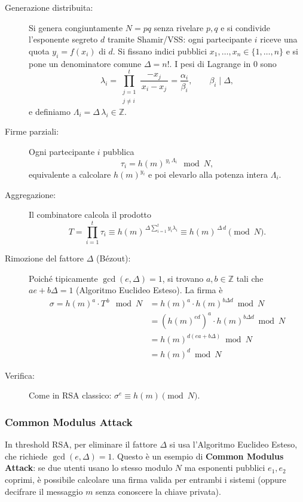 \documentclass[a4paper, 11pt]{article}
\begin{document}
\begin{description}
    \item[Generazione distribuita:] Si genera congiuntamente $N=pq$ senza rivelare $p,q$ e si condivide l’esponente segreto $d$ tramite Shamir/VSS: ogni partecipante $i$ riceve una quota $y_i=f(x_i)$ di $d$. Si fissano indici pubblici $x_1,\dots,x_n\in\{1,\dots,n\}$ e si pone un denominatore comune $\Delta=n!$. I pesi di Lagrange in $0$ sono
    \[
        \lambda_i=\prod_{\substack{j=1\\ j\neq i}}^{t}\frac{-x_j}{\,x_i-x_j\,}=\frac{\alpha_i}{\beta_i},\qquad \beta_i\mid \Delta,
    \]
    e definiamo $\Lambda_i=\Delta\,\lambda_i\in\mathbb{Z}$.
    \item[Firme parziali:] Ogni partecipante $i$ pubblica
    \[
        \tau_i = h(m)^{\,y_i\,\Lambda_i}\ \bmod N,
    \]
    equivalente a calcolare $h(m)^{y_i}$ e poi elevarlo alla potenza intera $\Lambda_i$.
    \item[Aggregazione:] Il combinatore calcola il prodotto
    \[
        T=\prod_{i=1}^{t}\tau_i \equiv h(m)^{\,\Delta\sum_{i=1}^{t}y_i\lambda_i}\equiv h(m)^{\,\Delta\,d}\pmod N.
    \]
    \item[Rimozione del fattore $\Delta$ (Bézout):] Poiché tipicamente $\gcd(e,\Delta)=1$, si trovano $a,b\in\mathbb{Z}$ tali che $ae+b\Delta=1$ (Algoritmo Euclideo Esteso). La firma è
    \begin{align*}        
        \sigma=h(m)^a\cdot T^{\,b}\ \bmod N 
        &= h(m)^a\cdot h(m)^{b \Delta d} \bmod N \\ 
        &= (h(m)^{ed})^a \cdot h(m)^{b\Delta d} \bmod N \\ 
        &= h(m)^{d(ea + b\Delta)} \bmod N \\ 
        &= h(m)^d \bmod N
    \end{align*}
    \item[Verifica:] Come in RSA classico: $\sigma^e \equiv h(m) \pmod N$.
\end{description}

\subsubsection{Common Modulus Attack}

In threshold RSA, per eliminare il fattore $\Delta$ si usa l'Algoritmo Euclideo Esteso, che richiede $\gcd(e,\Delta)=1$. Questo è un esempio di \textbf{Common Modulus Attack}: se due utenti usano lo stesso modulo $N$ ma esponenti pubblici $e_1,e_2$ coprimi, è possibile calcolare una firma valida per entrambi i sistemi (oppure decifrare il messaggio $m$ senza conoscere la chiave privata).
\end{document}
